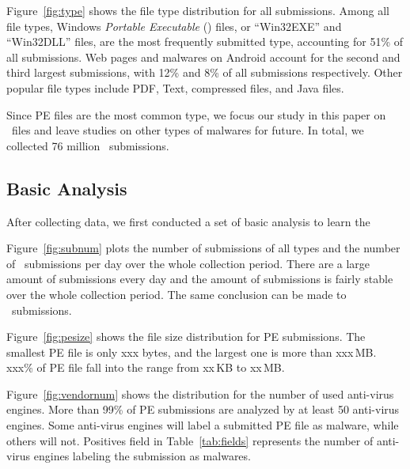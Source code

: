

Figure~\ref{fig:type} shows the file type distribution for all submissions. 
Among all file types, Windows \textit{Portable Executable} ({\em \pe}) files, or ``Win32EXE'' and ``Win32DLL'' files, 
are the most frequently submitted type,
accounting for 51\% of all submissions.
Web pages and malwares on Android account for the second and third largest submissions, 
with 12\% and 8\% of all submissions respectively. 
Other popular file types include PDF, Text, compressed files, and Java files. 

Since PE files are the most common type,
we focus our study in this paper on \pe\ files 
and leave studies on other types of malwares for future. 
In total, we collected 76 million \pe\ submissions.

\subsection{Basic Analysis}
After collecting data, we first conducted a set of basic analysis 
to learn the 



Figure~\ref{fig:subnum} plots the number of submissions of all types and the number of \pe\ submissions per day 
over the whole collection period.
There are a large amount of submissions every day
and the amount of submissions is fairly stable over the whole collection period.
The same conclusion can be made to \pe\ submissions.


Figure~\ref{fig:pesize} shows the file size distribution for PE submissions. 
The smallest PE file is only xxx bytes, and the largest one is more than xxx\,MB. 
xxx\% of PE file fall into the range from xx\,KB to xx\,MB. 



Figure~\ref{fig:vendornum} shows the distribution for the number of used anti-virus engines. 
More than 99\% of PE submissions are analyzed by at least 50 anti-virus engines. 
Some anti-virus engines will label a submitted PE file as malware, 
while others will not. 
Positives field in Table~\ref{tab:fields} represents the number of anti-virus engines labeling the submission as malwares. 


